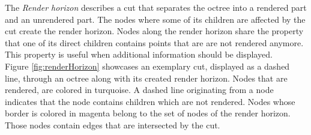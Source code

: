 The \textit{Render horizon} describes a cut that separates the octree into a rendered part and an unrendered part. The nodes where some of its children are affected by the cut create the render horizon. Nodes along the render horizon share the property that one of its direct children contains points that are are not rendered anymore. This property is useful when additional information should be displayed. 
\\
Figure \ref{fig:renderHorizon} showcases an exemplary cut, displayed as a dashed line, through an octree along with its created render horizon. Nodes that are rendered, are colored in turquoise. A dashed line originating from a node indicates that the node contains children which are not rendered. Nodes whose border is colored in magenta belong to the set of nodes of the render horizon. Those nodes contain edges that are intersected by the cut. 


